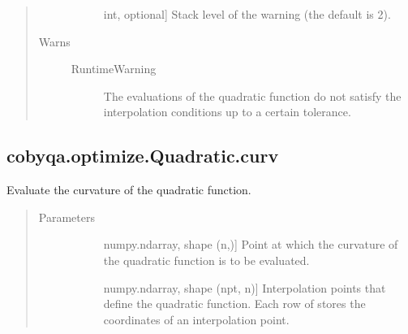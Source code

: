 \documentclass[letterpaper,10pt,english]{sphinxmanual}
\begin{document}
\begin{fulllineitems}
\begin{fulllineitems}
\begin{quote}
\begin{description}
\begin{description}
\item[{}] \leavevmode{[}int, optional{]}
\sphinxAtStartPar
Stack level of the warning (the default is 2).

\end{description}

\item[{Warns}] \leavevmode\begin{description}
\item[{RuntimeWarning}] \leavevmode
\sphinxAtStartPar
The evaluations of the quadratic function do not satisfy the
interpolation conditions up to a certain tolerance.

\end{description}

\end{description}\end{quote}

\end{fulllineitems}



\subsection{cobyqa.optimize.Quadratic.curv}
\label{\detokenize{refs/generated/cobyqa.optimize.Quadratic.curv:cobyqa-optimize-quadratic-curv}}\label{\detokenize{refs/generated/cobyqa.optimize.Quadratic.curv::doc}}

\begin{fulllineitems}
\label{\detokenize{refs/generated/cobyqa.optimize.Quadratic.curv:cobyqa.optimize.Quadratic.curv}}
\sphinxAtStartPar
Evaluate the curvature of the quadratic function.
\begin{quote}\begin{description}
\item[{Parameters}] \leavevmode\begin{description}
\item[{}] \leavevmode{[}numpy.ndarray, shape (n,){]}
\sphinxAtStartPar
Point at which the curvature of the quadratic function is to be
evaluated.

\item[{}] \leavevmode{[}numpy.ndarray, shape (npt, n){]}
\sphinxAtStartPar
Interpolation points that define the quadratic function. Each row of
 stores the coordinates of an interpolation point.


\end{description}
\end{description}
\end{quote}
\end{fulllineitems}
\end{fulllineitems}
\end{document}
